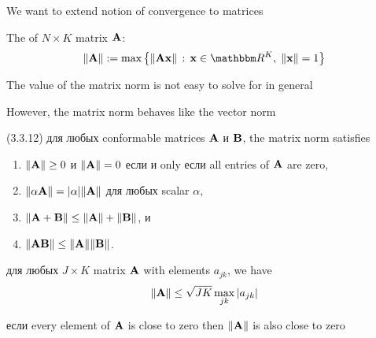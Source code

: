 \begin{frame}

    \vspace{2em}
    We want to extend notion of convergence to matrices
    
    \vspace{.7em}
    The  of $N \times K$ matrix $\mathbf A$:
    \begin{equation}
    \label{eq:mn}
    \| \boldA \| :=
    \max \left\{ 
        \| \boldA \boldx \| \,: \, 
        \boldx \in \RR^K, \; \| \boldx \| = 1
        \right\}
    \end{equation}

    \vspace{.7em}
    The value of the matrix norm is not easy to solve for in
    general
    
    However, the matrix
    norm behaves like the vector norm
    
\end{frame}

\begin{frame}

    \vspace{2em}
    \Fact (3.3.12)
    для любых conformable matrices $\mathbf A$ и $\mathbf B$, the matrix norm 
    satisfies
    \begin{enumerate}
        \item $\| \mathbf A \| \geq 0$ и $\| \mathbf A \| = 0$ если и only если all entries of
            $\mathbf A$ are zero,
        \item $\| \alpha \mathbf A \| = |\alpha| \| \mathbf A \|$ для любых scalar
            $\alpha$,
        \item $\| \mathbf A + \mathbf B \| \leq \| \mathbf A \| + \| \mathbf B \|$, и
        \item $\| \mathbf A \mathbf B \| \leq \| \mathbf A \| \| \mathbf B \|$.
    \end{enumerate}
    
    
\end{frame}

\begin{frame}

    \vspace{2em}
    \Fact{\eqref{ET-fa:mnbd}}
    для любых $J \times K$ matrix $\mathbf A$ with elements $a_{jk}$, we have
    \begin{equation*}
        \| \mathbf A \| \leq \sqrt{JK} \max_{jk} |a_{jk}|
    \end{equation*}
    
    \vspace{1em}
    если every element of
    $\mathbf A$ is close to zero then $\| \mathbf A \|$ is also close to zero

\end{frame}

